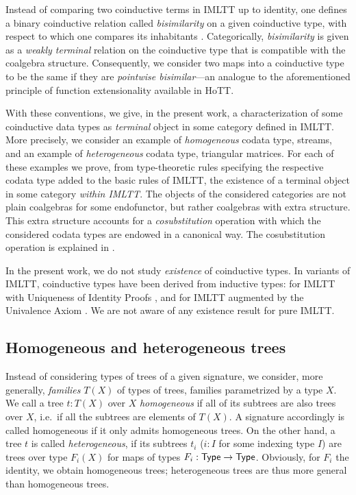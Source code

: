 \documentclass[a4paper,USenglish]{lipics}
\newcommand{\parencite}[1]{\cite{#1}}
\begin{document}
 Instead of comparing two coinductive terms in IMLTT up to identity, one defines a 
 binary coinductive relation called \emph{bisimilarity} on a given coinductive type, with respect to which one compares its inhabitants  \parencite{DBLP:conf/types/Coquand93}. 
 Categorically, \emph{bisimilarity} is given as a \emph{weakly terminal} relation on the coinductive type that is compatible with the coalgebra structure.
 Consequently, we consider two maps into a coinductive type to be the same if they are \emph{pointwise bisimilar}---an analogue
 to the aforementioned principle of function extensionality available in HoTT. 
 
 With these conventions, we give, in the present work, a characterization of some coinductive data types as \emph{terminal} object in some category 
 defined in IMLTT.
 More precisely, we consider an example of \emph{homogeneous} codata type, streams, and 
 an example of \emph{heterogeneous} codata type, triangular matrices.
 For each of these examples we prove, 
 from type-theoretic rules specifying the respective codata type added to the basic rules of IMLTT,
 the existence of a terminal object in some category \emph{within IMLTT}.
 The objects of the considered categories are not plain coalgebras for some endofunctor, but rather coalgebras with extra structure.
 This extra structure accounts for a \emph{cosubstitution} operation with which the considered codata types are endowed in a canonical way.
 The cosubstitution operation is explained in .

 In the present work, we do not study \emph{existence} of coinductive types. 
 In variants of IMLTT, coinductive types have been derived from inductive types: 
 for IMLTT with Uniqueness of Identity Proofs \cite{indexed_containers}, and for IMLTT augmented by the Univalence Axiom \cite{ahrens_capriotti_spadotti}.
 We are not aware of any existence result for pure IMLTT.

\subsection{Homogeneous and heterogeneous trees}\label{sec:hom_het}

Instead of considering types of trees of a given signature, we consider, more generally, \emph{families} $T(X)$ of types of trees, families parametrized by a type $X$.
We call a tree $t:T(X)$ over $X$ \emph{homogeneous} if all of its subtrees are also trees over $X$, i.e.\, if all the subtrees are elements of $T(X)$.
A signature accordingly is called homogeneous if it only admits homogeneous trees.
On the other hand, a tree $t$ is called \emph{heterogeneous}, if its subtrees $t_i$ ($i : I$ for some indexing type $I$) are trees over 
type $F_i(X)$ for maps of types $F_i : \mathsf{Type} \to \mathsf{Type}$. Obviously, for $F_i$ the identity, we obtain homogeneous trees; heterogeneous trees are thus more general than
homogeneous trees.
\end{document}
